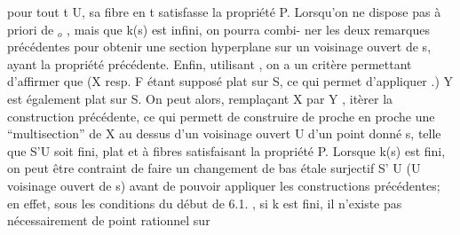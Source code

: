 pour tout t \hand{$\in$}U,  sa fibre  en  t satisfasse la propriété P.  Lorsqu'on ne
dispose pas à priori de \hand{$\xi$}$_{o}$ ,  mais que k(s) est infini, on pourra combi-%
ner les deux remarques précédentes pour obtenir une section hyperplane
sur un voisinage ouvert de s, ayant la propriété précédente.  Enfin,
utilisant  , on a un critère permettant d'affirmer que (X resp. F étant
supposé plat sur S, ce qui permet d'appliquer .)  Y\hand{$_{\xi}$}  est également
plat sur S. On peut alors, remplaçant X par Y\hand{$_{\xi}$} , itèrer la construction
précédente, ce qui permett  de construire de proche en proche une
``multisection''  de X au dessus d'un voisinage ouvert U d'un point donné s,
telle que S'\hand{$\longrightarrow$}U soit fini, plat et à fibres satisfaisant la propriété P.
Lorsque k(s) est fini, on peut être contraint de faire un changement de bas%
étale surjectif S'\hand{$\longrightarrow$} U (U voisinage ouvert de s) avant de pouvoir appliquer
les constructions précédentes; en effet, sous les conditions du début de
6.1. , si k est fini, il n'existe pas nécessairement de point rationnel sur
